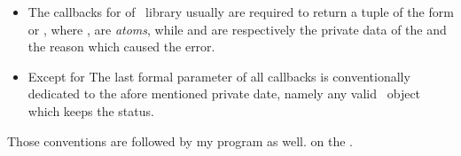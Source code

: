 \begin{itemize}

    \item   The callbacks for  of \OTP\ library usually
            are required to return a tuple of the form  or
            , where ,  are
            \emph{atoms}, while  and  are
            respectively the private data of the  and the reason which caused the error.

    \item   Except for  The last formal parameter of all
             callbacks is conventionally
            dedicated to the afore mentioned private date, namely any
            valid \Erlang\ object which keeps the status.

\end{itemize}

Those conventions are followed by my program as well.
 on the .

